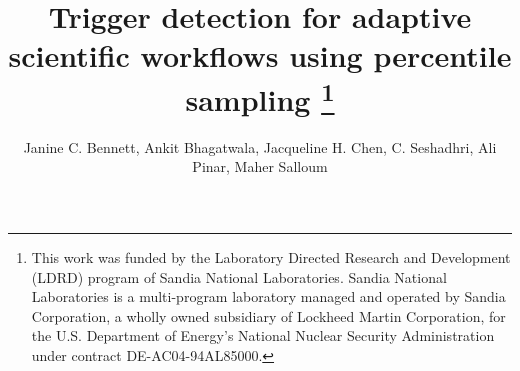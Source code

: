 \documentclass[final]{siamltex}
\begin{document}
\title{Trigger detection for adaptive scientific workflows using percentile sampling \thanks{This work was funded by the Laboratory Directed Research and Development (LDRD) program of  Sandia National Laboratories. Sandia National Laboratories is a multi-program laboratory managed and operated by Sandia Corporation, a wholly owned subsidiary of Lockheed Martin Corporation, for the U.S. Department of Energy's National Nuclear Security Administration under contract DE-AC04-94AL85000.}}

\author{Janine C. Bennett\footnotemark[1], Ankit Bhagatwala\footnotemark[1], Jacqueline H. Chen\footnotemark[1], C. Seshadhri\footnotemark[2], Ali Pinar\footnotemark[1], Maher Salloum\footnotemark[1] }

\maketitle

\renewcommand{\thefootnote}{\fnsymbol{footnote}}
\renewcommand{\thefootnote}{\arabic{footnote}}
\end{document}
